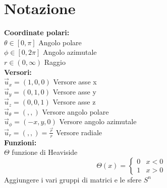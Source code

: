 \chapter{Notazione}
%
\textbf{Coordinate polari:}\\
 $\theta \in[0,\pi]$ Angolo polare\\
 $\phi \in [0,2\pi]$ Angolo azimutale\\
 $r \in (0,\infty)$ Raggio\\

\textbf{Versori:}\\
$\vec u_x = (1,0,0)$ Versore asse x \\
$\vec u_y = (0,1,0)$ Versore asse y \\
$\vec u_z = (0,0,1)$ Versore asse z \\

$\vec u _\theta = (,,)$ Versore angolo polare \\
$\vec u _\phi = (-x,y,0)$ Versore angolo azimutale \\
$\vec u _r = (,,) = \frac{\vec r}{r}$ Versore radiale \\


\textbf{Funzioni:}\\
$\Theta$ funzione di Heaviside
$$
    \Theta(x) = \begin{cases}
       0 & x < 0\\
       1 & x > 0
    \end{cases}
$$
Aggiungere i vari gruppi di matrici e le sfere $S^n$

